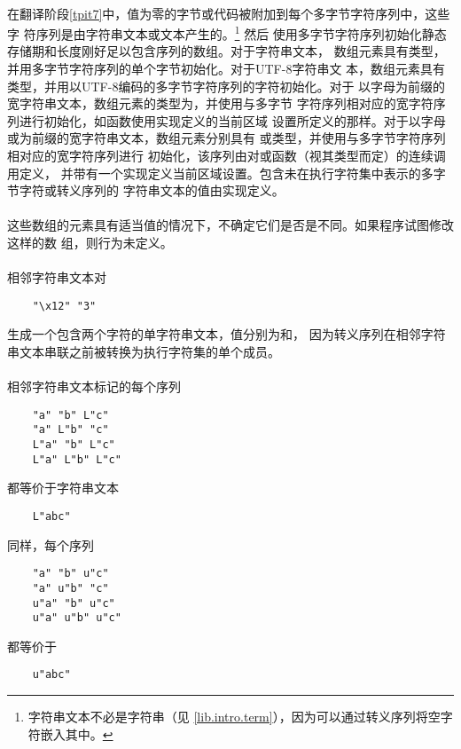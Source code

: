 {\paragraph{}
在翻译阶段\ref{tpit7}中，值为零的字节或代码被附加到每个多字节字符序列中，这些字
符序列是由字符串文本或文本产生的。\footnote{字符串文本不必是字符串（见
\ref{lib.intro.term}），因为可以通过转义序列将空字符嵌入其中。}  然后
使用多字节字符序列初始化静态存储期和长度刚好足以包含序列的数组。对于字符串文本，
数组元素具有类型，并用多字节字符序列的单个字节初始化。对于UTF-8字符串文
本，数组元素具有类型，并用以UTF-8编码的多字节字符序列的字符初始化。对于
以字母为前缀的宽字符串文本，数组元素的类型为，并使用与多字节
字符序列相对应的宽字符序列进行初始化，如函数使用实现定义的当前区域
设置所定义的那样。对于以字母或为前缀的宽字符串文本，数组元素分别具有
或类型，并使用与多字节字符序列相对应的宽字符序列进行
初始化，该序列由对或函数（视其类型而定）的连续调用定义，
并带有一个实现定义当前区域设置。包含未在执行字符集中表示的多字节字符或转义序列的
字符串文本的值由实现定义。

\paragraph{}
这些数组的元素具有适当值的情况下，不确定它们是否是不同。如果程序试图修改这样的数
组，则行为未定义。

\paragraph{}
\ex 相邻字符串文本对
\begin{lstlisting}
    "\x12" "3"
\end{lstlisting}
生成一个包含两个字符的单字符串文本，值分别为和\tm{\sq 3\sq}，
因为转义序列在相邻字符串文本串联之前被转换为执行字符集的单个成员。

\paragraph{}
\ex 相邻字符串文本标记的每个序列
\begin{lstlisting}
    "a" "b" L"c"
    "a" L"b" "c"
    L"a" "b" L"c"
    L"a" L"b" L"c"
\end{lstlisting}
都等价于字符串文本
\begin{lstlisting}
    L"abc"
\end{lstlisting}
同样，每个序列
\begin{lstlisting}
    "a" "b" u"c"
    "a" u"b" "c"
    u"a" "b" u"c"
    u"a" u"b" u"c"
\end{lstlisting}
都等价于
\begin{lstlisting}
    u"abc"
\end{lstlisting}

}
